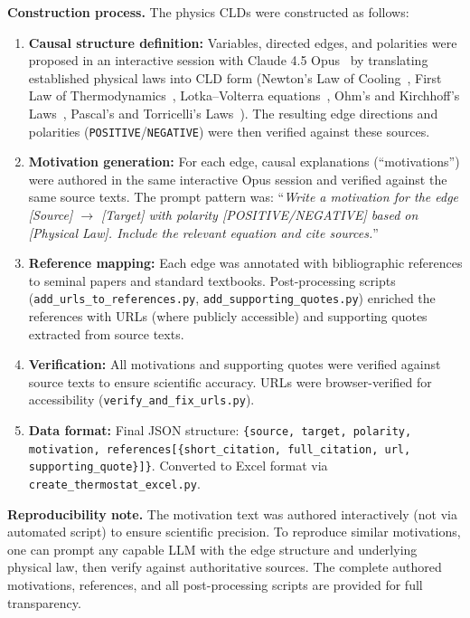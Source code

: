 \textbf{Construction process.} The physics CLDs were constructed as follows:
\begin{enumerate}[noitemsep]
    \item \textbf{Causal structure definition:} Variables, directed edges, and polarities were proposed in an interactive session with Claude 4.5 Opus~\cite{anthropic2025claude45opus} by translating established physical laws into CLD form (Newton's Law of Cooling~\cite{newton1701scala}, First Law of Thermodynamics~\cite{clausius1850heat}, Lotka--Volterra equations~\cite{lotka1925elements,volterra1928fluctuations}, Ohm's and Kirchhoff's Laws~\cite{ohm1827galvanische,kirchhoff1845durchgang}, Pascal's and Torricelli's Laws~\cite{pascal1663equilibre,torricelli1644opera}). The resulting edge directions and polarities (\texttt{POSITIVE}/\texttt{NEGATIVE}) were then verified against these sources.
    \item \textbf{Motivation generation:} For each edge, causal explanations (``motivations'') were authored in the same interactive Opus session and verified against the same source texts. The prompt pattern was: ``\textit{Write a motivation for the edge [Source] $\rightarrow$ [Target] with polarity [POSITIVE/NEGATIVE] based on [Physical Law]. Include the relevant equation and cite sources.}''
    \item \textbf{Reference mapping:} Each edge was annotated with bibliographic references to seminal papers and standard textbooks. Post-processing scripts (\texttt{add\_urls\_to\_references.py}, \texttt{add\_supporting\_quotes.py}) enriched the references with URLs (where publicly accessible) and supporting quotes extracted from source texts.
    \item \textbf{Verification:} All motivations and supporting quotes were verified against source texts to ensure scientific accuracy. URLs were browser-verified for accessibility (\texttt{verify\_and\_fix\_urls.py}).
    \item \textbf{Data format:} Final JSON structure: \texttt{\{source, target, polarity, motivation, references[\{short\_citation, full\_citation, url, supporting\_quote\}]\}}. Converted to Excel format via \texttt{create\_thermostat\_excel.py}.
\end{enumerate}

\noindent\textbf{Reproducibility note.} The motivation text was authored interactively (not via automated script) to ensure scientific precision. To reproduce similar motivations, one can prompt any capable LLM with the edge structure and underlying physical law, then verify against authoritative sources. The complete authored motivations, references, and all post-processing scripts are provided for full transparency.

